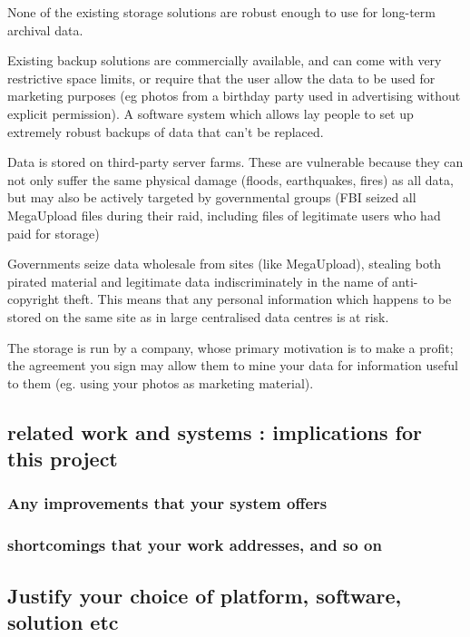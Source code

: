 \documentclass[12pt,a4paper,]{book}
\begin{document}
None of the existing storage solutions are robust enough to use for
long-term archival data.

Existing backup solutions are commercially available, and can come with
very restrictive space limits, or require that the user allow the data
to be used for marketing purposes (eg photos from a birthday party used
in advertising without explicit permission). A software system which
allows lay people to set up extremely robust backups of data that can't
be replaced.

Data is stored on third-party server farms. These are vulnerable because
they can not only suffer the same physical damage (floods, earthquakes,
fires) as all data, but may also be actively targeted by governmental
groups (FBI seized all MegaUpload files during their raid, including
files of legitimate users who had paid for storage)

Governments seize data wholesale from sites (like MegaUpload), stealing
both pirated material and legitimate data indiscriminately in the name
of anti-copyright theft. This means that any personal information which
happens to be stored on the same site as in large centralised data
centres is at risk.

The storage is run by a company, whose primary motivation is to make a
profit; the agreement you sign may allow them to mine your data for
information useful to them (eg. using your photos as marketing
material).

\subsection{related work and systems : implications for this
project}\label{related-work-and-systems-implications-for-this-project}

\subsubsection{Any improvements that your system
offers}\label{any-improvements-that-your-system-offers}

\subsubsection{shortcomings that your work addresses, and so
on}\label{shortcomings-that-your-work-addresses-and-so-on}

\subsection{Justify your choice of platform, software, solution
etc}\label{justify-your-choice-of-platform-software-solution-etc}
\end{document}
